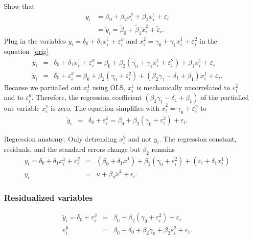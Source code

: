 \documentclass[a4paper,12pt]{article}
\begin{document}
Show that
\begin{eqnarray}
y_i &=\beta_0+\beta_{2}x^{2}_i+\beta_{1}x^{1}_i+\varepsilon_i \label{orig}\\
&=\tilde{y}_i=\tilde{\beta}_0+\tilde{\beta}_1\tilde{x}^{2}_i+\tilde{\varepsilon}_i.\nonumber
\end{eqnarray}
Plug in the variables $y_i=\delta_0+\delta_1x^{1}_i+\varepsilon^{y}_i$ and $x^{2}_i=\gamma_0+\gamma_1x^{1}_i+\varepsilon^{2}_i$ in the equation~\eqref{orig}
\begin{eqnarray}
y_i &=&\delta_0+\delta_1x^{1}_i+\varepsilon^{y}_i=\beta_0+\beta_{2}(\gamma_0+\gamma_1x^{1}_i+\varepsilon^{2}_i)+\beta_{1}x^{1}_i+\varepsilon_i\nonumber\\
\tilde{y}_i&=&\delta_0+\varepsilon^{y}_i=\beta_0+\beta_{2}(\gamma_0+\varepsilon^{2}_i)+(\beta_{2}\gamma_1-\delta_1+\beta_{1})x^{1}_i+\varepsilon_i.\nonumber
\end{eqnarray}
Because we partialled out $x^{1}_i$ using OLS, $x^{1}_i$ is mechanically uncorrelated to $\varepsilon^{2}_i$ and to $\varepsilon^{y}_i$. Therefore, the regression coefficient $(\beta_{2}\gamma_1-\delta_1+\beta_{1})$ of the partialled out variable $x^{1}_i$ is zero.
The equation simplifies with $\tilde{x}^{2}_i=\gamma_0+\varepsilon^{2}_i$ to
\begin{eqnarray}
\tilde{y}_i &=&\delta_0+\varepsilon^{y}_i=\beta_0+\beta_{2}(\gamma_0+\varepsilon^{2}_i)+\varepsilon_i.\nonumber
\end{eqnarray}



Regression anatomy: Only detrending $x^{2}_i$ and not $y_i$. The regression constant, residuals, and the standard errors change but $\beta_{2}$ remains
\begin{eqnarray}
y_i =\delta_0+\delta_1x^{1}_i+\varepsilon^{y}_i&=&(\beta_0+\delta_1\bar{x}^{1})+\beta_{2}(\gamma_0+\varepsilon^{2}_i)+(\varepsilon_i+\delta_1 x^{1}_i)\nonumber\\
y_i &=&\kappa+\beta_{2}\tilde{x}^{2}+\epsilon_i.\nonumber
\end{eqnarray}



\subsubsection*{Residualized variables}

\begin{eqnarray}
\tilde{y}_i =\delta_0+\varepsilon^{y}_i&=&\beta_0+\beta_{2}(\gamma_0+\varepsilon^{2}_i)+\varepsilon_i\nonumber\\
\varepsilon^{y}_i&=&\beta_0-\delta_0+\beta_{2}\gamma_0+\beta_{2}\varepsilon^{2}_i+\varepsilon_i.\nonumber
\end{eqnarray}
\end{document}
